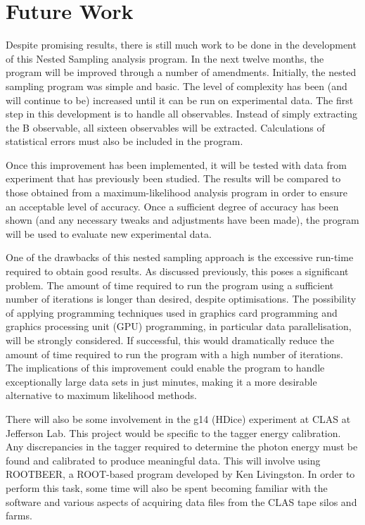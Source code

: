 \documentclass[a4paper,12pt]{article}
\begin{document}
\newpage

\section{Future Work}

Despite promising results, there is still much work to be done in the development of this Nested Sampling analysis program.  In the next twelve months, the program will be improved through a number of amendments.  Initially, the nested sampling program was simple and basic.  The level of complexity has been (and will continue to be) increased until it can be run on experimental data.  
The first step in this development is to handle all observables.  Instead of simply extracting the B observable, all sixteen observables will be extracted.  Calculations of statistical errors must also be included in the program.

Once this improvement has been implemented, it will be tested with data from experiment that has previously been studied.  The results will be compared to those obtained from a maximum-likelihood analysis program in order to ensure an acceptable level of accuracy. Once a sufficient degree of accuracy has been shown (and any necessary tweaks and adjustments have been made), the program will be used to evaluate new experimental data.

One of the drawbacks of this nested sampling approach is the excessive run-time required to obtain good results.  As discussed previously, this poses a significant problem.  The amount of time required to run the program using a sufficient number of iterations is longer than desired, despite optimisations.  The possibility of applying programming techniques used in graphics card programming and graphics processing unit (GPU) programming, in particular data parallelisation, will be strongly considered.  If successful, this would dramatically reduce the amount of time required to run the program with a high number of iterations. The implications of this improvement could enable the program to handle exceptionally large data sets in just minutes, making it a more desirable alternative to maximum likelihood methods.

There will also be some involvement in the g14 (HDice) experiment at CLAS at Jefferson Lab. This project would be specific to the tagger energy calibration.  Any discrepancies in the tagger required to determine the photon energy must be found and calibrated to produce meaningful data.  This will involve using ROOTBEER, a ROOT-based program developed by Ken Livingston.  In order to perform this task, some time will also be spent becoming familiar with the software and various aspects of acquiring data files from the CLAS tape silos and farms. 
\end{document}
